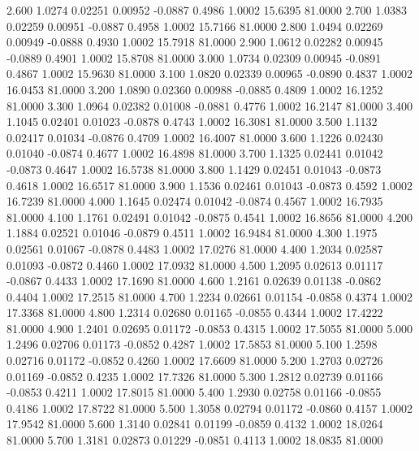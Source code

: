    2.600   1.0274   0.02251   0.00952  -0.0887   0.4986   1.0002  15.6395  81.0000
   2.700   1.0383   0.02259   0.00951  -0.0887   0.4958   1.0002  15.7166  81.0000
   2.800   1.0494   0.02269   0.00949  -0.0888   0.4930   1.0002  15.7918  81.0000
   2.900   1.0612   0.02282   0.00945  -0.0889   0.4901   1.0002  15.8708  81.0000
   3.000   1.0734   0.02309   0.00945  -0.0891   0.4867   1.0002  15.9630  81.0000
   3.100   1.0820   0.02339   0.00965  -0.0890   0.4837   1.0002  16.0453  81.0000
   3.200   1.0890   0.02360   0.00988  -0.0885   0.4809   1.0002  16.1252  81.0000
   3.300   1.0964   0.02382   0.01008  -0.0881   0.4776   1.0002  16.2147  81.0000
   3.400   1.1045   0.02401   0.01023  -0.0878   0.4743   1.0002  16.3081  81.0000
   3.500   1.1132   0.02417   0.01034  -0.0876   0.4709   1.0002  16.4007  81.0000
   3.600   1.1226   0.02430   0.01040  -0.0874   0.4677   1.0002  16.4898  81.0000
   3.700   1.1325   0.02441   0.01042  -0.0873   0.4647   1.0002  16.5738  81.0000
   3.800   1.1429   0.02451   0.01043  -0.0873   0.4618   1.0002  16.6517  81.0000
   3.900   1.1536   0.02461   0.01043  -0.0873   0.4592   1.0002  16.7239  81.0000
   4.000   1.1645   0.02474   0.01042  -0.0874   0.4567   1.0002  16.7935  81.0000
   4.100   1.1761   0.02491   0.01042  -0.0875   0.4541   1.0002  16.8656  81.0000
   4.200   1.1884   0.02521   0.01046  -0.0879   0.4511   1.0002  16.9484  81.0000
   4.300   1.1975   0.02561   0.01067  -0.0878   0.4483   1.0002  17.0276  81.0000
   4.400   1.2034   0.02587   0.01093  -0.0872   0.4460   1.0002  17.0932  81.0000
   4.500   1.2095   0.02613   0.01117  -0.0867   0.4433   1.0002  17.1690  81.0000
   4.600   1.2161   0.02639   0.01138  -0.0862   0.4404   1.0002  17.2515  81.0000
   4.700   1.2234   0.02661   0.01154  -0.0858   0.4374   1.0002  17.3368  81.0000
   4.800   1.2314   0.02680   0.01165  -0.0855   0.4344   1.0002  17.4222  81.0000
   4.900   1.2401   0.02695   0.01172  -0.0853   0.4315   1.0002  17.5055  81.0000
   5.000   1.2496   0.02706   0.01173  -0.0852   0.4287   1.0002  17.5853  81.0000
   5.100   1.2598   0.02716   0.01172  -0.0852   0.4260   1.0002  17.6609  81.0000
   5.200   1.2703   0.02726   0.01169  -0.0852   0.4235   1.0002  17.7326  81.0000
   5.300   1.2812   0.02739   0.01166  -0.0853   0.4211   1.0002  17.8015  81.0000
   5.400   1.2930   0.02758   0.01166  -0.0855   0.4186   1.0002  17.8722  81.0000
   5.500   1.3058   0.02794   0.01172  -0.0860   0.4157   1.0002  17.9542  81.0000
   5.600   1.3140   0.02841   0.01199  -0.0859   0.4132   1.0002  18.0264  81.0000
   5.700   1.3181   0.02873   0.01229  -0.0851   0.4113   1.0002  18.0835  81.0000
